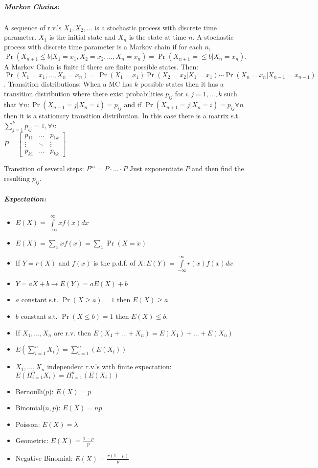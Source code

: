 \documentclass[landscape,10pt]{article}
\begin{document}
\begin{multicols}{4}
\subparagraph*{Markov Chains: }
A sequence of r.v.'s \(X_1, X_2, \ldots\) is a stochastic process with discrete time parameter. \(X_1\) is the initial state and \(X_n\) is the state at time \(n\). A stochastic process with discrete time parameter is a Markov chain if for each \(n\), \(\Pr(X_{n+1} \leq b | X_1 = x_1, X_2 = x_2, \ldots, X_n = x_n) = \Pr(X_{n+1} = \leq b | X_n = x_n)\). A Markov Chain is finite if there are finite possible states. Then: \(\Pr(X_1 = x_1, \ldots, X_n = x_n) = \Pr(X_1 = x_1) \Pr(X_2 = x_2 | X_1 = x_1) \cdots \Pr(X_n = x_n | X_{n-1} = x_{n-1}) \). Transition distributions: When a MC has \(k\) possible states then it has a transition distribution where there exist probabilities \(p_{ij}\) for \(i, j = 1, \ldots , k\) such that \(\forall n: \Pr(X_{n+1} = j | X_n = i) = p_{ij}\) and if \(\Pr(X_{n+1} = j | X_n = i) = p_{ij} \forall n\) then it is a stationary transition distribution. In this case there is a matrix s.t. \(\sum\limits_{j=1}^{k}{p_{ij}}=1,  \forall i\): \\
\(P = \begin{bmatrix} 
        p_{11} & \hdots & p_{1k} \\
        \vdots & \ddots & \vdots \\
         p_{k1} & \hdots & p_{kk}
     \end{bmatrix}\)
     
Transition of several steps: \(P^m = P \cdot \ldots \cdot P\) Just exponentiate \(P\) and then find the resulting \(p_{ij}\).

\subparagraph*{Expectation: }
\begin{itemize}
    \item[] \( E(X) = \int\limits_{-\infty}^{\infty}{x f(x)dx}\)
    \item[] \( E(X) = \sum\limits_{x}xf(x) = \sum\limits_{x}\Pr(X=x)\)
    \item[] If \(Y = r(X)\) and \(f(x)\) is the p.d.f. of \(X: E(Y) = \int\limits_{-\infty}^{\infty}{r(x)f(x)dx}\)
    \item[] \(Y = aX + b \rightarrow E(Y) = aE(X)+b\)
    \item[] \(a\) constant s.t. \(\Pr(X \geq a) = 1\) then \(E(X) \geq a\)
    \item[] \(b\) constant s.t. \(\Pr(X \leq b) = 1\) then \(E(X) \leq b\).
    \item[] If \(X_1, \ldots, X_n \) are r.v. then \(E(X_1+\ldots+X_n) = E(X_1) + \ldots +E(X_n)\)
    \item[] \(E\left( \sum_{i = 1}^{n}X_i \right) = \sum_{i = 1}^{n}(E(X_i))\)
    \item[] \(X_1, \ldots, X_n\) independent r.v.'s with finite expectation: \(E\left(\Pi_{i=1}^{n}{X_i} \right) = \Pi_{i=1}^{n}\left(E(X_i)\right)\)
    \item[] Bernoulli(\(p\)): \(E(X) = p\)
    \item[] Binomial(\(n,p\)): \(E(X) = np\)
    \item[] Poisson: \(E(X) = \lambda\)
    \item[] Geometric: \(E(X) = \frac{1-p}{p}\)
    \item[] Negative Binomial: \(E(X) = \frac{r(1-p)}{p}\)
\end{itemize}


\end{multicols}
\end{document}
